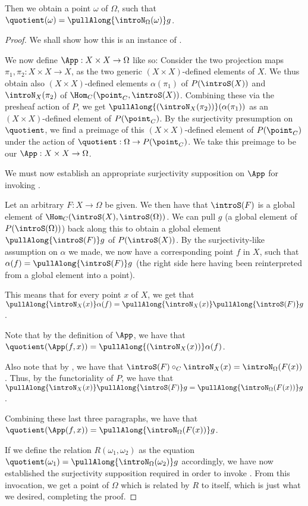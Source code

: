 Then we obtain a point $\omega$ of $\Omega$, such that $\quotient(\omega) = \pullAlong{\introN_{\Omega}(\omega)} g$.
\begin{proof}
We shall show how this is an instance of .

We now define $\App : X \times X \to \Omega$ like so: Consider the two projection maps $\pi_1, \pi_2 : X \times X \to X$, as the two generic $(X \times X)$-defined elements of $X$. We thus obtain also $(X \times X)$-defined elements $\alpha(\pi_1)$ of $P(\introS(X))$ and $\introN_{X}(\pi_2)$ of $\Hom_C(\point_C, \introS(X))$. Combining these via the presheaf action of $P$, we get $\pullAlong{( \introN_{X}(\pi_2) )} ( \alpha(\pi_1) )$ as an $(X \times X)$-defined element of $P(\point_C)$. By the surjectivity presumption on $\quotient$, we find a preimage of this $(X \times X)$-defined element of $P(\point_C)$ under the action of $\quotient : \Omega \to P(\point_C)$. We take this preimage to be our $\App : X \times X \to \Omega$.

We must now establish an appropriate surjectivity supposition on $\App$ for invoking . 

Let an arbitrary $F : X \to \Omega$ be given. We then have that $\introS(F)$ is a global element of $\Hom_C(\introS(X), \introS(\Omega))$. We can pull $g$ (a global element of $P(\introS(\Omega))$) back along this to obtain a global element $\pullAlong{\introS(F)} g$ of $P(\introS(X))$. By the surjectivity-like assumption on $\alpha$ we made, we now have a corresponding point $f$ in $X$, such that $\alpha(f) = \pullAlong{\introS(F)} g$ (the right side here having been reinterpreted from a global element into a point).

This means that for every point $x$ of $X$, we get that $\pullAlong{\introN_{X}(x)} \alpha(f) = \pullAlong{\introN_{X}(x)} \pullAlong{\introS(F)} g$.

Note that by the definition of $\App$, we have that $\quotient(\App(f, x)) = \pullAlong{( \introN_{X}(x) )} \alpha(f)$.

Also note that by , we have that $\introS(F) \circ_C \introN_{X}(x) = \introN_{\Omega}(F(x))$. Thus, by the functoriality of $P$, we have that $\pullAlong{\introN_{X}(x)} \pullAlong{\introS(F)} g =  \pullAlong{\introN_{\Omega}(F(x))} g$.

Combining these last three paragraphs, we have that $\quotient(\App(f, x)) =  \pullAlong{\introN_{\Omega}(F(x))} g$.

If we define the relation $R(\omega_1, \omega_2)$ as the equation $\quotient(\omega_1) = \pullAlong{\introN_{\Omega}(\omega_2)} g$ accordingly, we have now established the surjectivity supposition required in order to invoke . From this invocation, we get a point of $\Omega$ which is related by $R$ to itself, which is just what we desired, completing the proof.

\end{proof}
